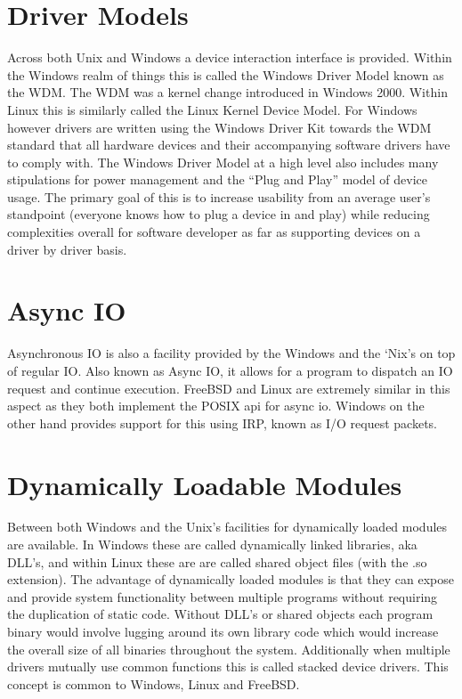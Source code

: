 \documentclass[letterpaper,10pt,draftclsnofoot,onecolumn]{IEEEtran}
\begin{document}
\newpage
\section{Driver Models}
Across both Unix and Windows a device interaction interface is provided. Within the Windows realm of things this is called the Windows Driver Model known as the WDM. The WDM was a kernel change introduced in Windows 2000. Within Linux this is similarly called the Linux Kernel Device Model. For Windows however drivers are written using the Windows Driver Kit towards the WDM standard that all hardware devices and their accompanying software drivers have to comply with. The Windows Driver Model at a high level also includes many stipulations for power management and the “Plug and Play” model of device usage. \cite{russinovich} The primary goal of this is to increase usability from an average user’s standpoint (everyone knows how to plug a device in and play) while reducing complexities overall for software developer as far as supporting devices on a driver by driver basis.\\

\section{Async IO}
Asynchronous IO is also a facility provided by the Windows and the ‘Nix’s on top of regular IO. Also known as Async IO, it allows for a program to dispatch an IO request and continue execution. FreeBSD and Linux are extremely similar in this aspect as they both implement the POSIX api for async io. Windows on the other hand provides support for this using IRP, known as I/O request packets.\\

\section{Dynamically Loadable Modules}
Between both Windows and the Unix’s facilities for dynamically loaded modules are available. In Windows these are called dynamically linked libraries, aka DLL’s, and within Linux these are are called shared object files (with the .so extension). The advantage of dynamically loaded modules is that they can expose and provide system functionality between multiple programs without requiring the duplication of static code. Without DLL’s or shared objects each program binary would involve lugging around its own library code which would increase the overall size of all binaries throughout the system. Additionally when multiple drivers mutually use common functions this is called stacked device drivers. This concept is common to Windows, Linux and FreeBSD.\\
\end{document}
